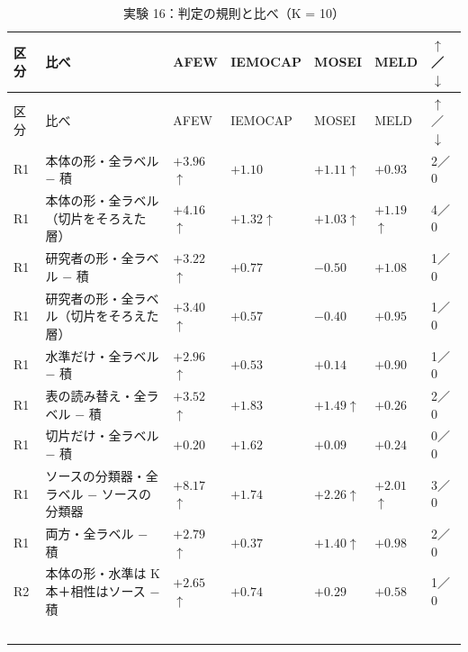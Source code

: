 \begin{longtable}{>{\raggedright}p{0.75cm}>{\raggedright}p{5.6cm}>{\raggedright}p{2.05cm}>{\raggedright}p{2.05cm}>{\raggedright}p{2.05cm}>{\raggedright}p{2.05cm}p{0.75cm}}
\caption{実験 16：判定の規則と比べ（K = 10）}\\
\toprule
区分 & 比べ & AFEW & IEMOCAP & MOSEI & MELD & $\uparrow$／$\downarrow$ \\
\midrule
\endfirsthead
\toprule
区分 & 比べ & AFEW & IEMOCAP & MOSEI & MELD & $\uparrow$／$\downarrow$ \\
\midrule
\endhead
\bottomrule
\endfoot

R1 & 本体の形・全ラベル $-$ 積 & $+3.96$$\uparrow$\newline{\tiny [$+$1.8, $+$6.1]} & $+1.10$\newline{\tiny [$-$0.4, $+$2.6]} & $+1.11$$\uparrow$\newline{\tiny [$+$0.7, $+$1.5]} & $+0.93$\newline{\tiny [$+$0.0, $+$1.9]} & 2／0 \\
R1 & 本体の形・全ラベル（切片をそろえた層） & $+4.16$$\uparrow$ & $+1.32$$\uparrow$ & $+1.03$$\uparrow$ & $+1.19$$\uparrow$ & 4／0 \\
R1 & 研究者の形・全ラベル $-$ 積 & $+3.22$$\uparrow$ & $+0.77$ & $-0.50$ & $+1.08$ & 1／0 \\
R1 & 研究者の形・全ラベル（切片をそろえた層） & $+3.40$$\uparrow$ & $+0.57$ & $-0.40$ & $+0.95$ & 1／0 \\
R1 & 水準だけ・全ラベル $-$ 積 & $+2.96$$\uparrow$ & $+0.53$ & $+0.14$ & $+0.90$ & 1／0 \\
R1 & 表の読み替え・全ラベル $-$ 積 & $+3.52$$\uparrow$ & $+1.83$ & $+1.49$$\uparrow$ & $+0.26$ & 2／0 \\
R1 & 切片だけ・全ラベル $-$ 積 & $+0.20$ & $+1.62$ & $+0.09$ & $+0.24$ & 0／0 \\
R1 & ソースの分類器・全ラベル $-$ ソースの分類器 & $+8.17$$\uparrow$ & $+1.74$ & $+2.26$$\uparrow$ & $+2.01$$\uparrow$ & 3／0 \\
R1 & 両方・全ラベル $-$ 積 & $+2.79$$\uparrow$ & $+0.37$ & $+1.40$$\uparrow$ & $+0.98$ & 2／0 \\
R2 & 本体の形・水準は K 本＋相性はソース $-$ 積 & $+2.65$$\uparrow$\newline{\tiny [$+$1.1, $+$4.2]} & $+0.74$\newline{\tiny [$-$0.2, $+$1.7]} & $+0.29$\newline{\tiny [$-$0.3, $+$0.9]} & $+0.58$\newline{\tiny [$-$0.3, $+$1.5]} & 1／0 \\
$$
\end{longtable}
